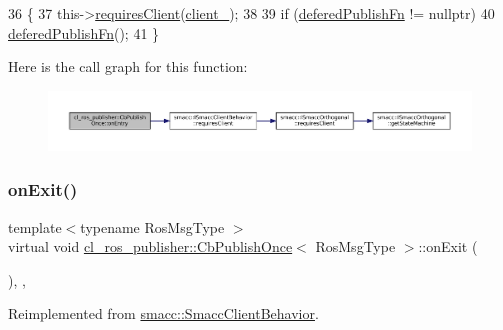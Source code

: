 \begin{DoxyCode}
36     \{
37         this->\hyperlink{classsmacc_1_1ISmaccClientBehavior_a32b16e99e3b4cb289414203dc861a440}{requiresClient}(\hyperlink{classcl__ros__publisher_1_1CbPublishOnce_aabb127ac2192a295ce9d11c63f3c9595}{client\_});
38 
39         \textcolor{keywordflow}{if} (\hyperlink{classcl__ros__publisher_1_1CbPublishOnce_a6222a91fb87cd3118ca9f84ff857c696}{deferedPublishFn} != \textcolor{keyword}{nullptr})
40             \hyperlink{classcl__ros__publisher_1_1CbPublishOnce_a6222a91fb87cd3118ca9f84ff857c696}{deferedPublishFn}();
41     \}
\end{DoxyCode}
Here is the call graph for this function\+:
\nopagebreak
\begin{figure}[H]
\begin{center}
\leavevmode
\includegraphics[width=350pt]{classcl__ros__publisher_1_1CbPublishOnce_afaed71bc2694ec1837278d5f931a76e1_cgraph}
\end{center}
\end{figure}
\mbox{\label{classcl__ros__publisher_1_1CbPublishOnce_ad82cb7d6ac69fe9b91bc955550ab92cb}} 
\subsubsection{\texorpdfstring{on\+Exit()}{onExit()}}
{\footnotesize\ttfamily template$<$typename Ros\+Msg\+Type $>$ \\
virtual void \hyperlink{classcl__ros__publisher_1_1CbPublishOnce}{cl\+\_\+ros\+\_\+publisher\+::\+Cb\+Publish\+Once}$<$ Ros\+Msg\+Type $>$\+::on\+Exit (\begin{DoxyParamCaption}{ }\end{DoxyParamCaption})\hspace{0.3cm}{\ttfamily [inline]}, {\ttfamily [override]}, {\ttfamily [virtual]}}



Reimplemented from \hyperlink{classsmacc_1_1SmaccClientBehavior_a7e4fb6ce81ff96dc172425852d69c0c5}{smacc\+::\+Smacc\+Client\+Behavior}.




